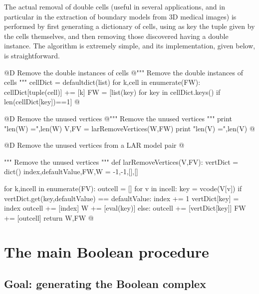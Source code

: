 \documentclass[11pt,oneside]{article}	%
\begin{document}
The actual removal of double cells (useful in several applications, and in particular in the extraction of boundary models from 3D medical images) is performed by first generating a dictionary of cells, using as key the tuple given by the cells themselves, and then removing those discovered having a double instance.
The algorithm is extremely simple, and its implementation, given below, is straightforward.

@D Remove the double instances of cells
@{""" Remove the double instances of cells """
cellDict = defaultdict(list)
for k,cell in enumerate(FW):
    cellDict[tuple(cell)] += [k]
FW = [list(key) for key in cellDict.keys() if len(cellDict[key])==1]
@}

@D Remove the unused vertices
@{""" Remove the unused vertices """
print "len(W) =",len(W)
V,FV = larRemoveVertices(W,FW)
print "len(V) =",len(V)
@}

@D Remove the unused vertices from a LAR model pair
@{""" Remove the unused vertices """
def larRemoveVertices(V,FV):
    vertDict = dict()
    index,defaultValue,FW,W = -1,-1,[],[]
        
    for k,incell in enumerate(FV):
        outcell = []
        for v in incell:
            key = vcode(V[v])
            if vertDict.get(key,defaultValue) == defaultValue:
                index += 1
                vertDict[key] = index
                outcell += [index]
                W += [eval(key)]
            else: 
                outcell += [vertDict[key]]
        FW += [outcell]
    return W,FW
@}

\section{The main Boolean procedure}

\subsection{Goal: generating the Boolean complex}
\end{document}
